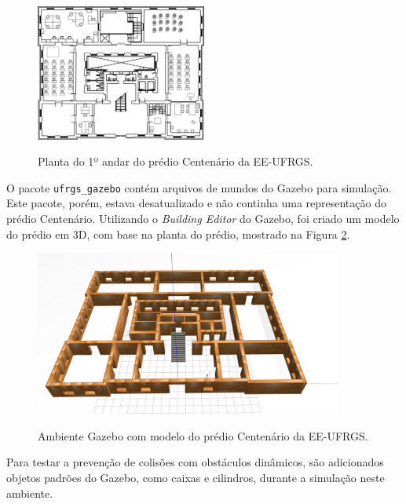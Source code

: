 \documentclass[repeatfields,xlists,xpacks,oneside,yearsonly]{ufrgscca}
\begin{document}
\begin{figure}[h]
    {
        \centering
        \caption{Planta do 1º andar do prédio Centenário da EE-UFRGS.}
        \label{fig:planta_centenario}
        \includegraphics[width=0.5\textwidth]{centenario_floor_plan.png}\\
    }
    {}
\end{figure}

O pacote \texttt{ufrgs\_gazebo} contém arquivos de mundos do Gazebo para 
simulação. 
Este pacote, porém, estava desatualizado e não continha uma representação do
prédio Centenário.
Utilizando o \textit{Building Editor} do Gazebo, foi criado um modelo do prédio
em 3D, com base na planta do prédio, mostrado na Figura \ref{fig:gazebo_centenario}.

\begin{figure}[h]
    {
        \centering
        \caption{Ambiente Gazebo com modelo do prédio Centenário da EE-UFRGS.}
        \label{fig:gazebo_centenario}
        \includegraphics[width=0.9\textwidth]{gazebo.png}\\
    }
    {}
\end{figure}

Para testar a prevenção de colisões com obstáculos dinâmicos, são
adicionados objetos padrões do Gazebo, como caixas e cilindros,
durante a simulação neste ambiente.
\end{document}
